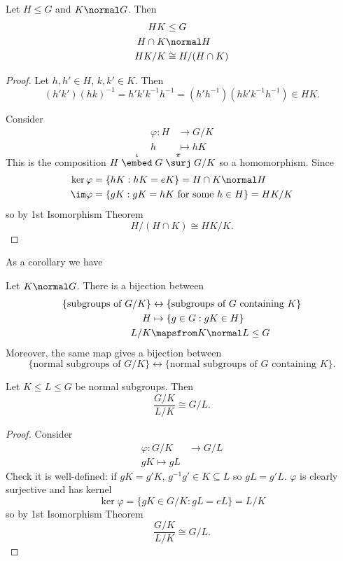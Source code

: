 \documentclass[a4paper]{article}
\theoremstyle{definition}
\begin{document}
\begin{theorem}
  Let \(H \leq G\) and \(K \normal G\). Then
  \begin{align*}
    HK &\leq G \\
    H \cap K &\normal H \\
    HK/K &\cong H/(H \cap K)
  \end{align*}
\end{theorem}

\begin{proof}
  Let \(h, h' \in H\), \(k, k' \in K\). Then
  \[
    (h'k')(hk)^{-1} = h'k'k^{-1}h^{-1} = (h'h^{-1})(hk'k^{-1}h^{-1}) \in HK.
  \]

  Consider
  \begin{align*}
    \varphi: H &\to G/K \\
    h &\mapsto hK
  \end{align*}
  This is the composition \(H \stackrel{\iota}{\embed} G \stackrel{\pi}{\surj} G/K\) so a homomorphism. Since
  \begin{align*}
    \ker \varphi &= \{hK: hK = eK\} = H \cap K \normal H \\
    \im \varphi &= \{gK: gK = hK \text{ for some } h \in H\} = HK/K
  \end{align*}
  so by 1st Isomorphism Theorem
  \[
    H/(H \cap K) \cong HK/K.
  \]
\end{proof}

As a corollary we have

\begin{theorem}
  Let \(K \normal G\). There is a bijection between
  \begin{align*}
    \{\text{subgroups of } G/K\} &\leftrightarrow \{\text{subgroups of \(G\) containing \(K\)}\} \\
    H &\mapsto \{g \in G: gK \in H\} \\
    L/K &\mapsfrom K \normal L \leq G
  \end{align*}
  Moreover, the same map gives a bijection between
  \[
    \{\text{normal subgroups of } G/K\} \leftrightarrow \{\text{normal subgroups of \(G\) containing \(K\)}\}.
  \]
\end{theorem}

\begin{theorem}
  Let \(K \leq L \leq G\) be normal subgroups. Then
  \[
    \frac{G/K}{L/K} \cong G/L.
  \]
\end{theorem}

\begin{proof}
  Consider
  \begin{align*}
    \varphi: G/K &\to G/L \\
    gK \mapsto gL
  \end{align*}
  Check it is well-defined: if \(gK = g'K\), \(g^{-1}g' \in K \subseteq L\) so \(gL = g'L\). \(\varphi\) is clearly surjective and has kernel
  \[
    \ker \varphi = \{gK \in G/K: gL = eL\} = L/K
  \]
  so by 1st Isomorphism Theorem
  \[
    \frac{G/K}{L/K} \cong G/L.
  \]
\end{proof}
\end{document}

